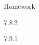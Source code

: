 \begin{frame}{Homework}
  \begin{center}

  7.8.2

  \vspace{2em}

  7.9.1


  \end{center}
\end{frame}








